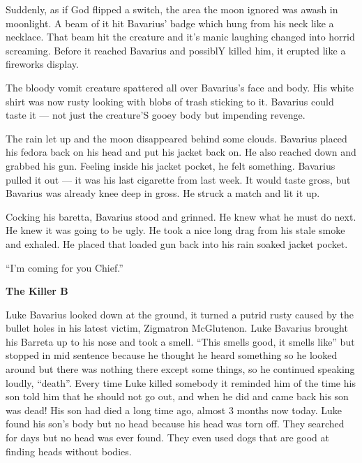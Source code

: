 Suddenly, as if God flipped a switch, the area the moon ignored was
awash in moonlight. A beam of it hit Bavarius' badge which hung
from his neck like a necklace. That beam hit the creature and it's
manic laughing changed into horrid screaming. Before it reached
Bavarius and possiblY killed him, it erupted like a fireworks
display.



The bloody vomit creature spattered all over Bavarius's face and
body. His white shirt was now rusty looking with blobs of trash
sticking to it. Bavarius could taste it --- not just the
creature'S gooey body but impending revenge.



The rain let up and the moon disappeared behind some clouds.
Bavarius placed his fedora back on his head and put his jacket back
on. He also reached down and grabbed his gun. Feeling inside his
jacket pocket, he felt something. Bavarius pulled it out --- it
was his last cigarette from last week. It would taste gross, but
Bavarius was already knee deep in gross. He struck a match and lit
it up.



Cocking his baretta, Bavarius stood and grinned. He knew what he
must do next. He knew it was going to be ugly. He took a nice long
drag from his stale smoke and exhaled. He placed that loaded gun
back into his rain soaked jacket pocket.



``I'm coming for you Chief.'' 

 





{\bf The Killer B}



Luke Bavarius looked down at the ground, it turned a putrid rusty
caused by the bullet holes in his latest victim, Zigmatron
McGlutenon. Luke Bavarius brought his Barreta up to his nose and
took a smell. ``This smells good, it smells like'' but
stopped in mid sentence because he thought he heard something so he
looked around but there was nothing there except some things, so he
continued speaking loudly, ``death''. Every time Luke
killed somebody it reminded him of the time his son told him that
he should not go out, and when he did and came back his son was
dead! His son had died a long time ago, almost 3 months now today.
Luke found his son's body but no head because his head was torn
off. They searched for days but no head was ever found. They even
used dogs that are good at finding heads without bodies.



